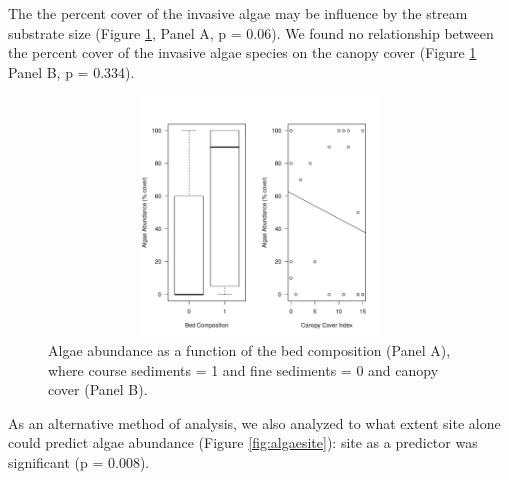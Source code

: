 \documentclass{article}\usepackage[]{graphicx}\usepackage[]{color}
\newenvironment{knitrout}{}{} %
\begin{document}
The the percent cover of the invasive algae may be influence by the stream substrate size (Figure \ref{fig:algae}, Panel A, p = 0.06). We found no relationship between the percent cover of the invasive algae species on the canopy cover (Figure \ref{fig:algae} Panel B, p = 0.334).

\begin{figure}[!ht]
\begin{knitrout}
\color{fgcolor}
\includegraphics[width=5in,height=2.5in]{figure/unnamed-chunk-2-1} 

\end{knitrout}
\caption{Algae abundance as a function of the bed composition (Panel A), where course sediments = 1 and fine sediments = 0 and canopy cover (Panel B).}
\label{fig:algae}
\end{figure}

As an alternative method of analysis, we also analyzed to what extent site alone could predict algae abundance (Figure \ref{fig:algaesite}): site as a predictor was significant (p = 0.008).
\end{document}
